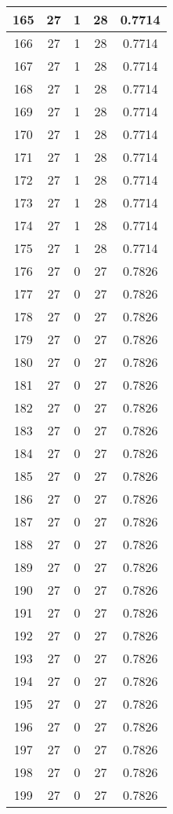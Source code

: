 \documentclass[letterpaper, 12pt]{article}
\begin{document}
\begin{longtable}{|c|c|c|c|c|}
\hline
165 & 27 & 1 & 28 & 0.7714 \\
\hline
166 & 27 & 1 & 28 & 0.7714 \\
\hline
167 & 27 & 1 & 28 & 0.7714 \\
\hline
168 & 27 & 1 & 28 & 0.7714 \\
\hline
169 & 27 & 1 & 28 & 0.7714 \\
\hline
170 & 27 & 1 & 28 & 0.7714 \\
\hline
171 & 27 & 1 & 28 & 0.7714 \\
\hline
172 & 27 & 1 & 28 & 0.7714 \\
\hline
173 & 27 & 1 & 28 & 0.7714 \\
\hline
174 & 27 & 1 & 28 & 0.7714 \\
\hline
175 & 27 & 1 & 28 & 0.7714 \\
\hline
176 & 27 & 0 & 27 & 0.7826 \\
\hline
177 & 27 & 0 & 27 & 0.7826 \\
\hline
178 & 27 & 0 & 27 & 0.7826 \\
\hline
179 & 27 & 0 & 27 & 0.7826 \\
\hline
180 & 27 & 0 & 27 & 0.7826 \\
\hline
181 & 27 & 0 & 27 & 0.7826 \\
\hline
182 & 27 & 0 & 27 & 0.7826 \\
\hline
183 & 27 & 0 & 27 & 0.7826 \\
\hline
184 & 27 & 0 & 27 & 0.7826 \\
\hline
185 & 27 & 0 & 27 & 0.7826 \\
\hline
186 & 27 & 0 & 27 & 0.7826 \\
\hline
187 & 27 & 0 & 27 & 0.7826 \\
\hline
188 & 27 & 0 & 27 & 0.7826 \\
\hline
189 & 27 & 0 & 27 & 0.7826 \\
\hline
190 & 27 & 0 & 27 & 0.7826 \\
\hline
191 & 27 & 0 & 27 & 0.7826 \\
\hline
192 & 27 & 0 & 27 & 0.7826 \\
\hline
193 & 27 & 0 & 27 & 0.7826 \\
\hline
194 & 27 & 0 & 27 & 0.7826 \\
\hline
195 & 27 & 0 & 27 & 0.7826 \\
\hline
196 & 27 & 0 & 27 & 0.7826 \\
\hline
197 & 27 & 0 & 27 & 0.7826 \\
\hline
198 & 27 & 0 & 27 & 0.7826 \\
\hline
199 & 27 & 0 & 27 & 0.7826 \\
\hline
\end{longtable}
\end{document}
